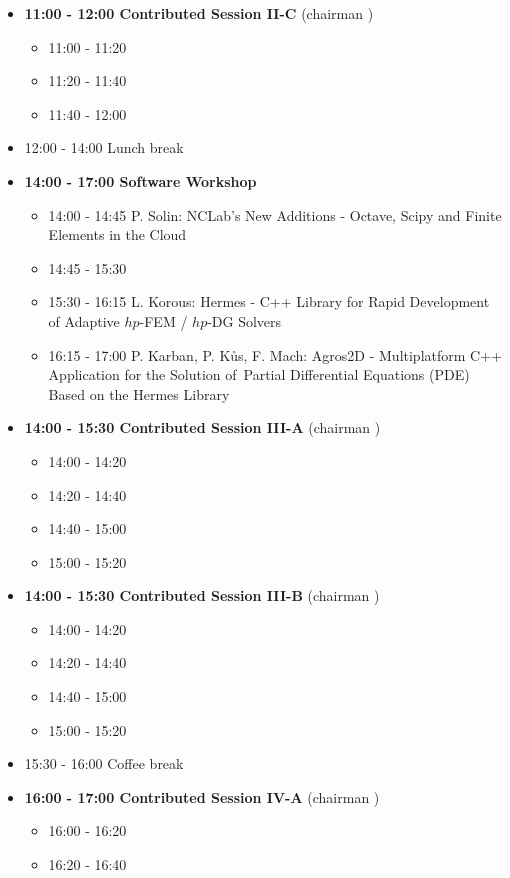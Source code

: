 \documentclass[10pt, A4]{article}
\begin{document}
\begin{itemize}
  \item {\bf 11:00 - 12:00 Contributed Session II-C} (chairman ) 
  \begin{itemize}
    \item 11:00 - 11:20 
    \item 11:20 - 11:40 
    \item 11:40 - 12:00 
  \end{itemize}
  \item 12:00 - 14:00 Lunch break
  \item {\bf 14:00 - 17:00 Software Workshop}
  \begin{itemize}
    \item 14:00 - 14:45 P. Solin: NCLab's New Additions - Octave, Scipy and Finite Elements in the Cloud
    \item 14:45 - 15:30 
    \item 15:30 - 16:15 L. Korous: Hermes - C++ Library for Rapid Development of Adaptive $hp$-FEM / $hp$-DG Solvers
    \item 16:15 - 17:00 P. Karban, P. K\r{u}s, F. Mach: Agros2D - Multiplatform C++ Application for the Solution of~Partial Differential Equations (PDE) Based on the Hermes Library
  \end{itemize}
  \item {\bf 14:00 - 15:30 Contributed Session III-A} (chairman ) 
  \begin{itemize}
    \item 14:00 - 14:20 
    \item 14:20 - 14:40 
    \item 14:40 - 15:00
    \item 15:00 - 15:20  
  \end{itemize}
  \item {\bf 14:00 - 15:30 Contributed Session III-B} (chairman ) 
  \begin{itemize}
    \item 14:00 - 14:20 
    \item 14:20 - 14:40 
    \item 14:40 - 15:00
    \item 15:00 - 15:20  
  \end{itemize}
  \item 15:30 - 16:00 Coffee break
  \item {\bf 16:00 - 17:00 Contributed Session IV-A} (chairman ) 
  \begin{itemize}
    \item 16:00 - 16:20 
    \item 16:20 - 16:40 

\end{itemize}
\end{itemize}
\end{document}
